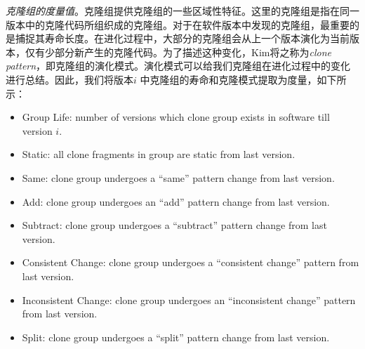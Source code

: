 {\em 克隆组的度量值}。克隆组提供克隆组的一些区域性特征。这里的克隆组是指在同一版本中的克隆代码所组织成的克隆组。对于在软件版本中发现的克隆组，最重要的是捕捉其寿命长度。在进化过程中，大部分的克隆组会从上一个版本演化为当前版本，仅有少部分新产生的克隆代码。为了描述这种变化，Kim将之称为{\em clone pattern}，即克隆组的演化模式。演化模式可以给我们克隆组在进化过程中的变化进行总结。因此，我们将版本$ i $ 中克隆组的寿命和克隆模式提取为度量，如下所示：
\begin{itemize}
\item {Group Life}: number of versions which clone group exists in software till version $i$.
\item {Static}:	all clone fragments in group are static from last version.
\item {Same}:	clone group undergoes a ``same'' pattern change from  last version.
\item {Add}: clone group undergoes an ``add'' pattern change from last version.
\item {Subtract}: clone group undergoes a ``subtract'' pattern change from last version.
\item {Consistent Change}: clone group undergoes a ``consistent change'' pattern from last version.
\item {Inconsistent Change}: clone group undergoes an ``inconsistent change'' pattern from last version.
\item {Split}: clone group undergoes a ``split'' pattern change from last version.
\end{itemize}

